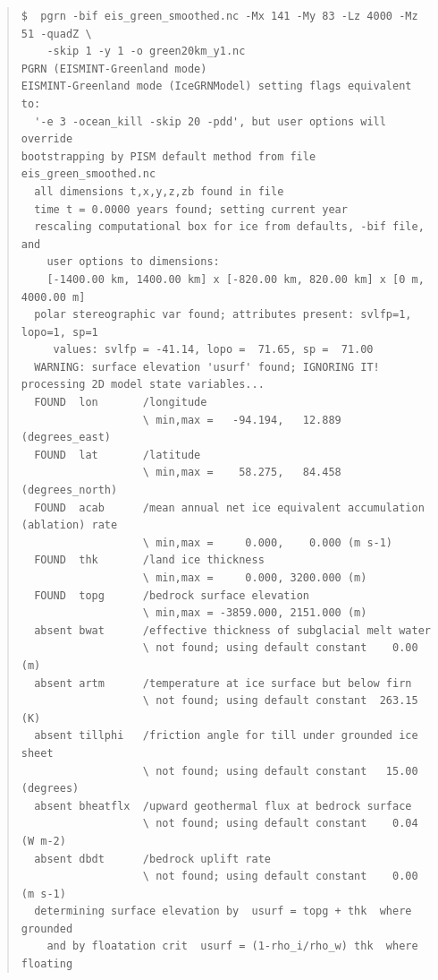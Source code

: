 \documentclass[11pt,final]{amsart}
\begin{document}
\begin{table}
\scriptsize
\begin{quote}
\begin{verbatim}
$  pgrn -bif eis_green_smoothed.nc -Mx 141 -My 83 -Lz 4000 -Mz 51 -quadZ \
    -skip 1 -y 1 -o green20km_y1.nc
PGRN (EISMINT-Greenland mode)
EISMINT-Greenland mode (IceGRNModel) setting flags equivalent to:
  '-e 3 -ocean_kill -skip 20 -pdd', but user options will override
bootstrapping by PISM default method from file eis_green_smoothed.nc
  all dimensions t,x,y,z,zb found in file
  time t = 0.0000 years found; setting current year
  rescaling computational box for ice from defaults, -bif file, and
    user options to dimensions:
    [-1400.00 km, 1400.00 km] x [-820.00 km, 820.00 km] x [0 m, 4000.00 m]
  polar stereographic var found; attributes present: svlfp=1, lopo=1, sp=1
     values: svlfp = -41.14, lopo =  71.65, sp =  71.00
  WARNING: surface elevation 'usurf' found; IGNORING IT!
processing 2D model state variables...
  FOUND  lon       /longitude                                                   
                   \ min,max =   -94.194,   12.889 (degrees_east)
  FOUND  lat       /latitude                                                    
                   \ min,max =    58.275,   84.458 (degrees_north)
  FOUND  acab      /mean annual net ice equivalent accumulation (ablation) rate 
                   \ min,max =     0.000,    0.000 (m s-1)
  FOUND  thk       /land ice thickness                                          
                   \ min,max =     0.000, 3200.000 (m)
  FOUND  topg      /bedrock surface elevation                                   
                   \ min,max = -3859.000, 2151.000 (m)
  absent bwat      /effective thickness of subglacial melt water                
                   \ not found; using default constant    0.00 (m)
  absent artm      /temperature at ice surface but below firn                   
                   \ not found; using default constant  263.15 (K)
  absent tillphi   /friction angle for till under grounded ice sheet            
                   \ not found; using default constant   15.00 (degrees)
  absent bheatflx  /upward geothermal flux at bedrock surface                   
                   \ not found; using default constant    0.04 (W m-2)
  absent dbdt      /bedrock uplift rate                                         
                   \ not found; using default constant    0.00 (m s-1)
  determining surface elevation by  usurf = topg + thk  where grounded
    and by floatation crit  usurf = (1-rho_i/rho_w) thk  where floating

\end{verbatim}
\end{quote}
\end{table}
\end{document}
